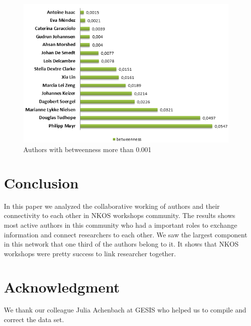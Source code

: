 \documentclass[runningheads,a4paper]{llncs}
\begin{document}
\begin{figure}
\centering
\includegraphics[width=0.8\linewidth]{betweenness}
\caption{Authors with betweenness more than 0.001}
\label{fig:betweenness}
\end{figure}




\section{Conclusion}\label{concl}
In this paper we analyzed the collaborative working of authors and their connectivity to each other in NKOS workshops community. The results shows most active authors in this community who had a important roles to exchange information and connect researchers to each other. We saw the largest component in this network that one third of the authors belong to it. It shows that NKOS workshops were pretty success to link researcher together.  


\section{Acknowledgment}\label{sec:ACKNOWLEDGMENTS}
We thank our colleague Julia Achenbach at GESIS who helped us to compile and correct the data set.

\newpage

 
\end{document}
